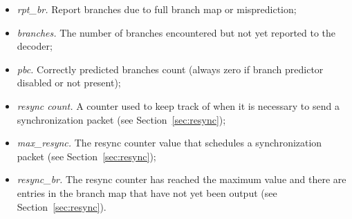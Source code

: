\begin{itemize}
  \item \textit{rpt\_br.} Report branches due to full branch map or misprediction;
  \item \textit{branches.}  The number of branches encountered but not yet reported to the decoder;
  \item \textit{pbc.} Correctly predicted branches count (always zero if branch predictor disabled or not present);
  \item \textit{resync count.} A counter used to keep track of when it is necessary to send 
    a synchronization packet (see Section~\ref{sec:resync});
  \item \textit{max\_resync.}  The resync counter value that schedules a synchronization packet (see Section~\ref{sec:resync});
  \item \textit{resync\_br.} The resync counter has reached the maximum value and there are
    entries in the branch map that have not yet been output (see Section~\ref{sec:resync}).
\end{itemize}

